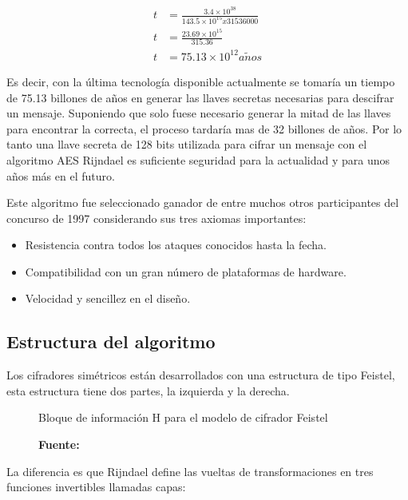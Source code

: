 \documentclass[../main/main.tex]{subfiles}
\begin{document}
  \vspace{-0.7cm}\begin{equation}
    \begin{aligned}
    t &= \frac{3.4 \times 10^{38}}{143.5 \times 10^{15} x 31536000} \\
    t &= \frac{23.69 \times 10^{15}}{315.36} \\
    t &= 75.13 \times 10^{12} a\tilde{n}os
    \end{aligned}
  \end{equation}

  Es decir, con la última tecnología disponible actualmente se tomaría un tiempo de 75.13 billones de años en generar las llaves secretas necesarias para descifrar un mensaje. Suponiendo que solo fuese necesario generar la mitad de las llaves para encontrar la correcta, el proceso tardaría mas de 32 billones de años. Por lo tanto una llave secreta de 128 bits utilizada para cifrar un mensaje con el algoritmo AES Rijndael es suficiente seguridad para la actualidad y para unos años más en el futuro.

  Este algoritmo fue seleccionado ganador de entre muchos otros participantes del concurso de 1997 considerando sus tres axiomas importantes:

  \begin{itemize}[noitemsep,nolistsep]
    \item Resistencia contra todos los ataques conocidos hasta la fecha.
    \item Compatibilidad con un gran número de plataformas de hardware.
    \item Velocidad y sencillez en el diseño.
  \end{itemize}

  \subsection{Estructura del algoritmo}

    Los cifradores simétricos están desarrollados con una estructura de tipo Feistel, esta estructura tiene dos partes, la izquierda y la derecha.

    \begin{figure}[H]
      \centering
      \caption{Bloque de información H para el modelo de cifrador Feistel}
      
      \caption*{\textbf{Fuente:} \cite{report:seguridad_europea_eeuu}}
    \end{figure}

    La diferencia es que Rijndael define las vueltas de transformaciones en tres funciones invertibles llamadas capas:
\end{document}
